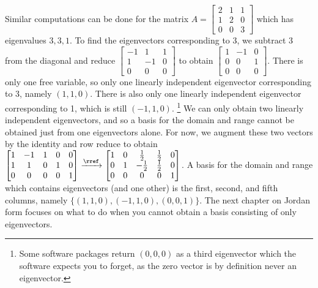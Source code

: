 \begin{example}
Similar computations can be done for the matrix
$A=
\begin{bmatrix}
 2 & 1 & 1 \\
 1 & 2 & 0 \\
 0 & 0 & 3
\end{bmatrix}
$ which has eigenvalues $3,3,1$. To find the eigenvectors corresponding to 3, we subtract 3 from the diagonal and reduce 
$
\begin{bmatrix}
 -1 & 1 & 1 \\
 1 & -1 & 0 \\
 0 & 0 & 0
\end{bmatrix}
$
to obtain
$
\begin{bmatrix}
 1 & -1 & 0 \\
 0 & 0 & 1\\
 0 & 0 & 0
\end{bmatrix}
$. 
There is only one free variable, so only one linearly independent eigenvector corresponding to 3, namely $(1,1,0)$. There is also only one linearly independent eigenvector corresponding to 1, which is still $(-1,1,0)$. 
\footnote{Some software packages return $(0,0,0)$ as a third eigenvector which the software expects you to forget, as the zero vector is by definition never an eigenvector.}
We can only obtain two linearly independent eigenvectors, and so a basis for the domain and range cannot be obtained just from one eigenvectors alone. For now, we augment these two vectors by the identity and row reduce to obtain 
$
\begin{bmatrix}
 1 & -1 & 1 & 0 & 0 \\
 1 & 1 & 0 & 1 & 0 \\
 0 & 0 & 0 & 0 & 1
\end{bmatrix}
\xrightarrow{\rref}
\begin{bmatrix}
 1 & 0 & \frac{1}{2} & \frac{1}{2} & 0 \\
 0 & 1 & -\frac{1}{2} & \frac{1}{2} & 0 \\
 0 & 0 & 0 & 0 & 1
\end{bmatrix}
$. A basis for the domain and range which contains eigenvectors (and one other) is the first, second, and fifth columns, namely $\{ (1,1,0), (-1,1,0), (0,0,1) \}$.  The next chapter on Jordan form focuses on what to do when you cannot obtain a basis consisting of only eigenvectors. 
\end{example}









